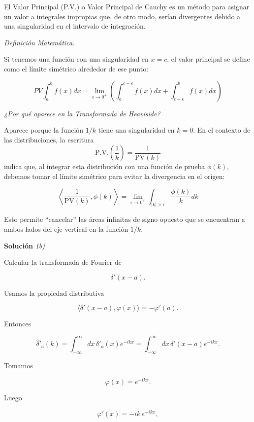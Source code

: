 \documentclass[11pt,spanish]{article}
\begin{document}
El Valor Principal (P.V.) o Valor Principal de Cauchy es un método para asignar un valor a integrales impropias que, de otro modo, serían divergentes debido a una singularidad en el intervalo de integración.

\vspace{0.5cm}
{\em Definición Matemática.}
\vspace{0.5cm}

Si tenemos una función con una singularidad en $x=c$, el valor principal se define como el límite simétrico alrededor de ese punto:

$$PV \int_{a}^{b} f(x) dx = \lim_{\epsilon \to 0^+} \left( \int_{a}^{c-\epsilon} f(x) dx + \int_{c+\epsilon}^{b} f(x) dx \right)$$

\vspace{0.5cm}
{\em ¿Por qué aparece en la Transformada de Heaviside?}
\vspace{0.5cm}

Aparece porque la función $1/k$ tiene una singularidad en $k=0$. En el contexto de las distribuciones, la escritura 
$$
\mathrm{P.V.}
\left(
\frac{1}{k}
\right)
=
\frac{1}{\text{PV}(k)}
$$ 
indica que, al integrar esta distribución con una función de prueba $\phi(k)$, debemos tomar el límite simétrico para evitar la divergencia en el origen:

$$\left\langle \frac{1}{\text{PV}(k)} , \phi(k) \right\rangle = \lim_{\epsilon \to 0^+} \int_{|k|>\epsilon} \frac{\phi(k)}{k} dk$$

Esto permite ``cancelar'' las áreas infinitas de signo opuesto que se encuentran a ambos lados del eje vertical en la función $1/k$.


\vspace{0.5cm}
{\bf Soluci\'on }{\em 1b)}
\vspace{0.5cm}

Calcular la transformada de Fourier de

$$
\delta'(x-a).
$$

Usamos la propiedad distributiva

$$
\langle \delta'(x-a) , \varphi(x)\rangle
=
-\varphi'(a).
$$

Entonces

$$
\hat{\delta}'_a(k)
=
\int_{-\infty}^{\infty} dx\,\delta'_a(x)e^{-ikx}
=
\int_{-\infty}^{\infty} dx\,\delta'(x-a)e^{-ikx}.
$$

Tomamos

$$
\varphi(x)=e^{-ikx}.
$$

Luego

$$
\varphi'(x)=-ik\,e^{-ikx},
$$
\end{document}
